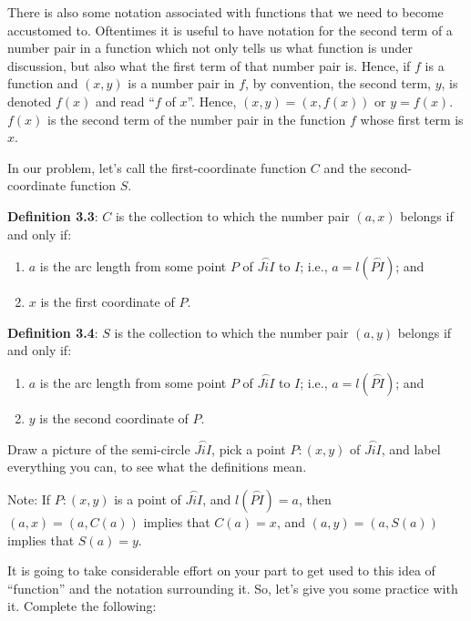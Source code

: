 \documentclass[english]{book}
\newcommand{\arc}[1]{\overset{\frown}{#1} }
\begin{document}
There is also some notation associated with functions that we need to become accustomed to. Oftentimes it is useful to have notation for the second term of a number pair in a function which not only tells us what function is under discussion, but also what the first term of that number pair is. Hence, if $f$ is a function and $(x,y)$ is a number pair in $f$, by convention, the second term, $y$, is denoted $f(x)$ and read ``$f$ of $x$''. Hence, $(x,y) = (x,f(x))$ or $y = f(x)$. $f(x)$ is the second term of the number pair in the function $f$ whose first term is $x$.

In our problem, let's call the first-coordinate function $C$ and the second-coordinate function $S$.

\vspace{0.3cm}

\textbf{Definition 3.3}: $C$ is the collection to which the number pair $(a,x)$ belongs if and only if:
\begin{enumerate}[\hspace{1cm}1)]
  \item $a$ is the arc length from some point $P$ of $\arc{JiI}$ to $I$; i.e., $a = l(\arc{PI})$; and
  \item $x$ is the first coordinate of $P$.
\end{enumerate}

\textbf{Definition 3.4}: $S$ is the collection to which the number pair $(a,y)$ belongs if and only if:
\begin{enumerate}[\hspace{1cm}1)]
  \item $a$ is the arc length from some point $P$ of $\arc{JiI}$ to $I$; i.e., $a = l(\arc{PI})$; and
  \item $y$ is the second coordinate of $P$.
\end{enumerate}

Draw a picture of the semi-circle $\arc{JiI}$, pick a point $P:(x,y)$ of $\arc{JiI}$, and label everything you can, to see what the definitions mean.

Note: If $P:(x,y)$ is a point of $\arc{JiI}$, and $l(\arc{PI}) = a$, then $(a,x) = (a,C(a))$ implies that $C(a) = x$, and $(a,y) = (a,S(a))$ implies that $S(a) = y$. 

\vspace{0.3cm}

It is going to take considerable effort on your part to get used to this idea of ``function'' and the notation surrounding it. So, let's give you some practice with it. Complete the following:
\end{document}

